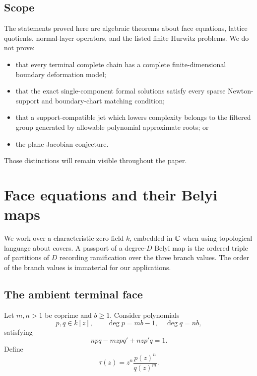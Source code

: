 \documentclass[11pt,reqno]{amsart}
\begin{document}
\subsection{Scope}

The statements proved here are algebraic theorems about face equations,
lattice quotients, normal-layer operators, and the listed finite Hurwitz
problems.  We do not prove:

\begin{itemize}
\item that every terminal complete chain has a complete finite-dimensional
boundary deformation model;
\item that the exact single-component formal solutions satisfy every sparse
Newton-support and boundary-chart matching condition;
\item that a support-compatible jet which lowers complexity belongs to the
filtered group generated by allowable polynomial approximate roots; or
\item the plane Jacobian conjecture.
\end{itemize}

Those distinctions will remain visible throughout the paper.

\section{Face equations and their Belyi maps}
\label{sec:faces}

We work over a characteristic-zero field \(k\), embedded in \(\mathbb C\) when
using topological language about covers.  A passport of a degree-\(D\)
Belyi map is the ordered triple of partitions of \(D\) recording
ramification over the three branch values.  The order of the branch values
is immaterial for our applications.

\subsection{The ambient terminal face}

Let \(m,n>1\) be coprime and \(b\ge1\).  Consider polynomials
\[
p,q\in k[z],\qquad
\deg p=mb-1,\quad \deg q=nb,
\]
satisfying
\begin{equation}
\label{eq:ambient-ode}
npq-mzpq'+nzp'q=1.
\end{equation}
Define
\begin{equation}
\label{eq:ambient-tau}
\tau(z)=z^n\frac{p(z)^n}{q(z)^m}.
\end{equation}
\end{document}

